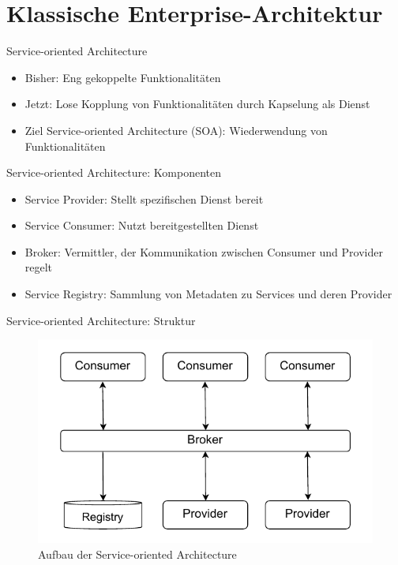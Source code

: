 \section{Klassische Enterprise-Architektur}


\begin{frame}{Service-oriented Architecture}
  \begin{itemize}
    \item Bisher: Eng gekoppelte Funktionalitäten
    \item Jetzt: Lose Kopplung von Funktionalitäten durch Kapselung als Dienst
    \item Ziel Service-oriented Architecture (SOA): Wiederwendung von Funktionalitäten
  \end{itemize}
\end{frame}

\begin{frame}{Service-oriented Architecture: Komponenten}
  \begin{itemize}
    \item Service Provider: Stellt spezifischen Dienst bereit
    \item Service Consumer: Nutzt bereitgestellten Dienst
    \item Broker: Vermittler, der Kommunikation zwischen Consumer und Provider regelt
    \item Service Registry: Sammlung von Metadaten zu Services und deren Provider
  \end{itemize}
\end{frame}

\begin{frame}{Service-oriented Architecture: Struktur}
  \begin{figure}[!h]
    \centering
    \includegraphics[scale=0.80]{imglib/soa/soa}
    \caption{Aufbau der Service-oriented Architecture}
    \label{fig:soa}
  \end{figure}
\end{frame}


